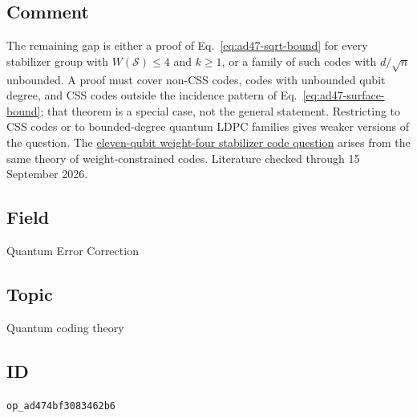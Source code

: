\subsection*{Comment}

The remaining gap is either a proof of Eq.~\eqref{eq:ad47-sqrt-bound} for every stabilizer group with $W(\mathcal S)\leq4$ and $k\geq1$, or a family of such codes with $d/\sqrt n$ unbounded. A proof must cover non-CSS codes, codes with unbounded qubit degree, and CSS codes outside the incidence pattern of Eq.~\eqref{eq:ad47-surface-bound}; that theorem is a special case, not the general statement. Restricting to CSS codes or to bounded-degree quantum LDPC families gives weaker versions of the question. The \href{https://qiqc-op.com/problem/op_458e9e86ccbddccb/}{eleven-qubit weight-four stabilizer code question} arises from the same theory of weight-constrained codes. Literature checked through 15 September 2026.

\subsection*{Field}

Quantum Error Correction

\subsection*{Topic}

Quantum coding theory

\subsection*{ID}

\texttt{op\_ad474bf3083462b6}

